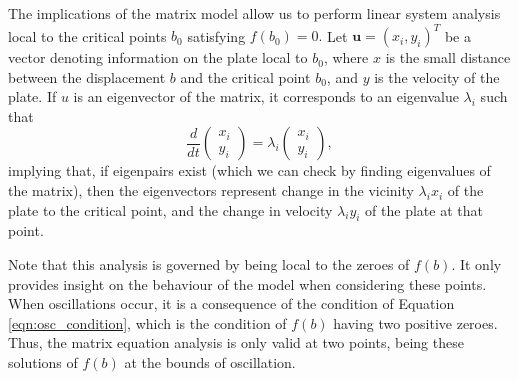 \documentclass{article}
\begin{document}
The implications of the matrix model allow us to perform linear system analysis local to the critical points $b_0$ satisfying $f(b_0) = 0.$
Let $\mathbf{u}=(x_i,y_i)^T$ be a vector denoting information on the plate local to $b_0$,
where $x$ is the small distance between the displacement $b$ and the critical point $b_0$,
and $y$ is the velocity of the plate.
If $u$ is an eigenvector of the matrix,
it corresponds to an eigenvalue $\lambda_i$ such that
\begin{equation}
	\frac{d}{dt} \begin{pmatrix}
		x_i \\
		y_i
	\end{pmatrix} = \lambda_i \begin{pmatrix}
	    x_i \\
	    y_i
    \end{pmatrix},
\label{eqn:matrix_eigenvectors}
\end{equation}
implying that, if eigenpairs exist (which we can check by finding eigenvalues of the matrix),
then the eigenvectors represent change in the vicinity $\lambda_i x_i$ of the plate to the critical point,
and the change in velocity $\lambda_i y_i$ of the plate at that point.

Note that this analysis is governed by being local to the zeroes of $f(b)$.
It only provides insight on the behaviour of the model when considering these points.
When oscillations occur, it is a consequence of the condition of Equation \ref{eqn:osc_condition},
which is the condition of $f(b)$ having two positive zeroes.
Thus, the matrix equation analysis is only valid at two points,
being these solutions of $f(b)$ at the bounds of oscillation.
\end{document}

